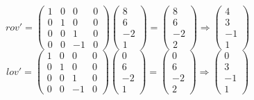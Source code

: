 \documentclass{article}
\begin{document}
\[
rov' = \begin{pmatrix}
        1&0&0&0\\
        0&1&0&0\\
        0&0&1&0\\
        0&0&-1&0
\end{pmatrix}
\begin{pmatrix}
        8\\6\\-2\\1
\end{pmatrix}
=
\begin{pmatrix}
 8\\6\\-2\\2
\end{pmatrix}
\Rightarrow
\begin{pmatrix}
 4\\3\\-1\\1
\end{pmatrix}
\]
\[
lov' = \begin{pmatrix}
        1&0&0&0\\
        0&1&0&0\\
        0&0&1&0\\
        0&0&-1&0
\end{pmatrix}
\begin{pmatrix}
        0\\6\\-2\\1
\end{pmatrix}
=
\begin{pmatrix}
 0\\6\\-2\\2
\end{pmatrix}
\Rightarrow
\begin{pmatrix}
 0\\3\\-1\\1
\end{pmatrix}
\]
\end{document}
